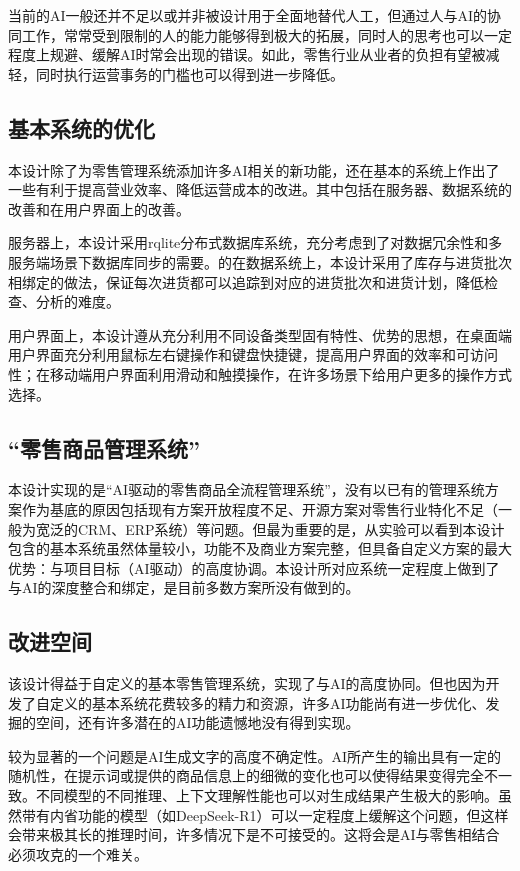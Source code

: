 当前的AI一般还并不足以或并非被设计用于全面地替代人工，但通过人与AI的协同工作，常常受到限制的人的能力能够得到极大的拓展，同时人的思考也可以一定程度上规避、缓解AI时常会出现的错误。如此，零售行业从业者的负担有望被减轻，同时执行运营事务的门槛也可以得到进一步降低。

\subsection{基本系统的优化}

本设计除了为零售管理系统添加许多AI相关的新功能，还在基本的系统上作出了一些有利于提高营业效率、降低运营成本的改进。其中包括在服务器、数据系统的改善和在用户界面上的改善。

服务器上，本设计采用rqlite分布式数据库系统，充分考虑到了对数据冗余性和多服务端场景下数据库同步的需要。的在数据系统上，本设计采用了库存与进货批次相绑定的做法，保证每次进货都可以追踪到对应的进货批次和进货计划，降低检查、分析的难度。

用户界面上，本设计遵从充分利用不同设备类型固有特性、优势的思想，在桌面端用户界面充分利用鼠标左右键操作和键盘快捷键，提高用户界面的效率和可访问性；在移动端用户界面利用滑动和触摸操作，在许多场景下给用户更多的操作方式选择。

\subsection{“零售商品管理系统”}

本设计实现的是“AI驱动的零售商品全流程管理系统”，没有以已有的管理系统方案作为基底的原因包括现有方案开放程度不足、开源方案对零售行业特化不足（一般为宽泛的CRM、ERP系统）等问题。但最为重要的是，从实验可以看到本设计包含的基本系统虽然体量较小，功能不及商业方案完整，但具备自定义方案的最大优势：与项目目标（AI驱动）的高度协调。本设计所对应系统一定程度上做到了与AI的深度整合和绑定，是目前多数方案所没有做到的。

\subsection{改进空间}

该设计得益于自定义的基本零售管理系统，实现了与AI的高度协同。但也因为开发了自定义的基本系统花费较多的精力和资源，许多AI功能尚有进一步优化、发掘的空间，还有许多潜在的AI功能遗憾地没有得到实现。

较为显著的一个问题是AI生成文字的高度不确定性。AI所产生的输出具有一定的随机性，在提示词或提供的商品信息上的细微的变化也可以使得结果变得完全不一致。不同模型的不同推理、上下文理解性能也可以对生成结果产生极大的影响。虽然带有内省功能的模型（如DeepSeek-R1）可以一定程度上缓解这个问题，但这样会带来极其长的推理时间，许多情况下是不可接受的。这将会是AI与零售相结合必须攻克的一个难关。


